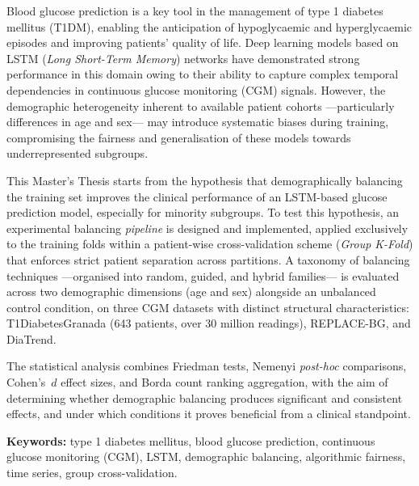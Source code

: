 Blood glucose prediction is a key tool in the management of type 1 diabetes mellitus (T1DM), enabling the anticipation of hypoglycaemic and hyperglycaemic episodes and improving patients' quality of life. Deep learning models based on LSTM (\textit{Long Short-Term Memory}) networks have demonstrated strong performance in this domain owing to their ability to capture complex temporal dependencies in continuous glucose monitoring (CGM) signals. However, the demographic heterogeneity inherent to available patient cohorts —particularly differences in age and sex— may introduce systematic biases during training, compromising the fairness and generalisation of these models towards underrepresented subgroups.

This Master's Thesis starts from the hypothesis that demographically balancing the training set improves the clinical performance of an LSTM-based glucose prediction model, especially for minority subgroups. To test this hypothesis, an experimental balancing \textit{pipeline} is designed and implemented, applied exclusively to the training folds within a patient-wise cross-validation scheme (\textit{Group K-Fold}) that enforces strict patient separation across partitions. A taxonomy of balancing techniques —organised into random, guided, and hybrid families— is evaluated across two demographic dimensions (age and sex) alongside an unbalanced control condition, on three CGM datasets with distinct structural characteristics: T1DiabetesGranada (643 patients, over 30 million readings), REPLACE-BG, and DiaTrend.

The statistical analysis combines Friedman tests, Nemenyi \textit{post-hoc} comparisons, Cohen's~$d$ effect sizes, and Borda count ranking aggregation, with the aim of determining whether demographic balancing produces significant and consistent effects, and under which conditions it proves beneficial from a clinical standpoint.

\bigskip
\noindent\textbf{Keywords:} type 1 diabetes mellitus, blood glucose prediction, continuous glucose monitoring (CGM), LSTM, demographic balancing, algorithmic fairness, time series, group cross-validation.